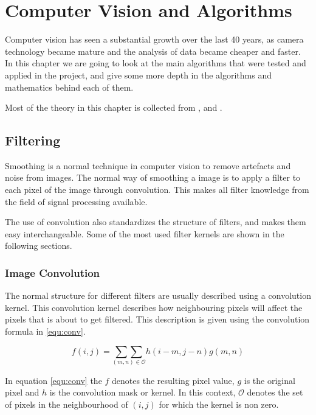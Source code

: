 
\chapter{Computer Vision and Algorithms}\label{chp:vision}

Computer vision has seen a substantial growth over the last 40 years, as camera technology became mature 
and the analysis of data became cheaper and faster. In this chapter we are going to look at the main algorithms 
that were tested and applied in the project, and give some more depth in the algorithms and mathematics behind each of them.

Most of the theory in this chapter is collected from \citet{sonka07}, \citet{tdt4265} and \citet{davies05}.

\section{Filtering}\label{sec:smooth}
Smoothing is a normal technique in computer vision to remove artefacts and noise from images. The normal way 
of smoothing a image is to apply a filter to each pixel of the image through convolution. This makes 
all filter knowledge from the field of signal processing available.

The use of convolution also standardizes the structure of filters, and makes them easy interchangeable. Some 
of the most used filter kernels are shown in the following sections.

\subsection{Image Convolution}
The normal structure for different filters are usually described using a convolution kernel. This convolution kernel 
describes how neighbouring pixels will affect the pixels that is about to get filtered. This 
description is given using the convolution formula in \eqref{equ:conv}.

\begin{equation}\label{equ:conv}
	f(i,j) = \underset{(m,n) \in \mathcal{O}}{\sum \sum} h(i-m,j-n)g(m,n)
\end{equation}

In equation \eqref{equ:conv} the $f$ denotes the resulting pixel value, $g$ is the original pixel and $h$ is the convolution mask or kernel.
In this context, $\mathcal{O}$ denotes the set of pixels in the neighbourhood of $(i,j)$ for which the kernel is non zero.

